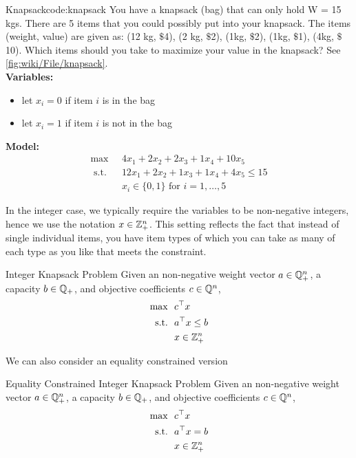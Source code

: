 \documentclass[../open-optimization/open-optimization.tex]{subfiles}
\begin{document}
\begin{examplewithcode}{Knapsack}{code:knapsack}
\label{example:knapsack}
You have a knapsack (bag) that can only hold W = 15 kgs.  There are 5 items that you could possibly put into your knapsack.  The items (weight, value) are given as:
(12 kg, $\$$4), (2 kg, $\$$2), (1kg, $\$$2), (1kg, $\$$1), (4kg, $\$$10).  Which items should you take to maximize your value in the knapsack? See \autoref{fig:wiki/File/knapsack}.\\

\noindent \textbf{Variables:}
\begin{itemize}
\item let $x_i = 0$ if item $i$ is in the bag
\item let $x_i = 1$ if item $i$ is not in the bag
\end{itemize}
\textbf{Model:}
\begin{equation}
\begin{split}
\max  \  \ &4 x_1 + 2 x_2 + 2 x_3 + 1 x_4 + 10 x_5\\
\text{ s.t. }\ \ &  12 x_1 + 2 x_2 + 1 x_3 + 1 x_4 + 4 x_5 \leq 15\\
& x_i \in \{0,1\} \text{ for } i=1, \dots, 5
\end{split}
\end{equation}
\end{examplewithcode}
In the integer case, we typically require the variables to be non-negative integers, hence we use the notation $x \in {\mathbb{Z}}^n_+$.  This setting reflects the fact that instead of single individual items, you have item types of which you can take as many of each type as you like that meets the constraint.
\begin{general}{Integer Knapsack Problem}{\npcomplete}
Given an non-negative weight vector $a \in {\mathbb{Q}}^n_+$, a capacity $b \in {\mathbb{Q}}_+$, and objective coefficients $c \in {\mathbb{Q}}^n$, 
\begin{equation}
\begin{split}
\max \ \ & c^\top x\\
\text{s.t.}\ \ & a^\top x \leq b\\
& x \in {\mathbb{Z}}^n_+
\end{split}
\end{equation}
\end{general}
We can also consider an equality constrained version
\begin{general}{Equality Constrained Integer Knapsack Problem}{\nphard}
Given an non-negative weight vector $a \in {\mathbb{Q}}^n_+$, a capacity $b \in {\mathbb{Q}}_+$, and objective coefficients $c \in {\mathbb{Q}}^n$, 
\begin{align}
\max \ \ & c^\top x\\
\text{s.t.}\ \ & a^\top x = b\\
& x \in {\mathbb{Z}}^n_+
\end{align}
\end{general}
\end{document}
